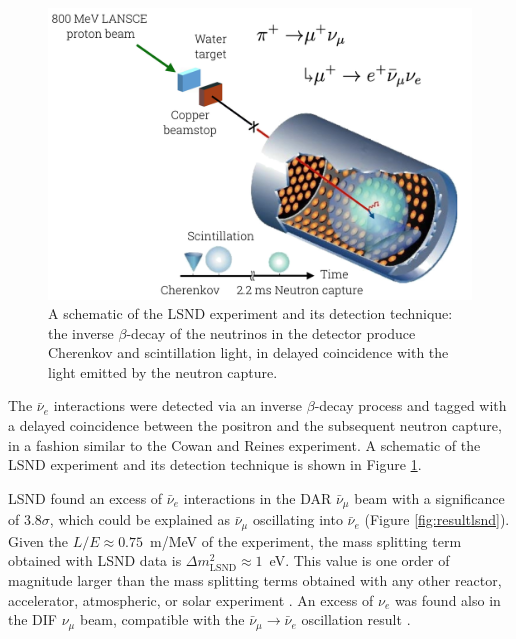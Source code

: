 \begin{figure}[htbp]
    \centering
    \includegraphics[width=0.9\linewidth]{figures/lsnd_exp.png}
    \caption{A schematic of the LSND experiment and its detection technique: the inverse $\beta$-decay of the neutrinos in the detector produce Cherenkov and scintillation light, in delayed coincidence with the light emitted by the neutron capture.}
    \label{fig:lsnd_exp}
\end{figure}

The $\bar{\nu}_e$ interactions were detected via an inverse $\beta$-decay process and tagged with a delayed coincidence between the positron and the subsequent neutron capture, in a fashion similar to the Cowan and Reines experiment. A schematic of the LSND experiment and its detection technique is shown in Figure \ref{fig:lsnd_exp}.

LSND found an excess of $\bar{\nu}_e$ interactions in the DAR $\bar{\nu}_{\mu}$ beam with a significance of $3.8\sigma$, which could be explained as $\bar{\nu}_\mu$ oscillating into $\bar{\nu}_e$ (Figure \ref{fig:resultlsnd}). Given the $L/E\approx0.75$~m/MeV of the experiment, the mass splitting term obtained with LSND data is $\Delta m_{\mathrm{LSND}}^2\approx1$~eV. This value is one order of magnitude larger than the mass splitting terms obtained with any other reactor, accelerator, atmospheric, or solar experiment \cite{Aguilar:2001ty}. An excess of $\nu_{e}$ was found also in the DIF $\nu_{\mu}$ beam, compatible with the $\bar{\nu}_\mu \rightarrow \bar{\nu}_e$ oscillation result \cite{Athanassopoulos:1997pv}. 

